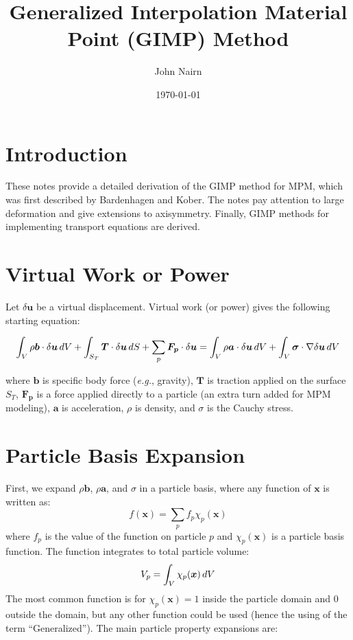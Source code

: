 \documentclass[11pt]{article}
\title{Generalized Interpolation Material Point (GIMP) Method}
\author{John Nairn}
\date{\today}
\renewcommand{\vec}[1]{\boldsymbol{#1}}
\newcommand{\tens}[1]{\boldsymbol{\mathsf{#1}}}
\begin{document}
\maketitle

\section{Introduction}

These notes provide a detailed derivation of the GIMP method for MPM, which was first described by Bardenhagen and Kober. The notes pay attention to large deformation and give extensions to axisymmetry. Finally, GIMP methods for implementing transport equations are derived.

\section{Virtual Work or Power}

Let $\delta\vec u$ be a virtual displacement. Virtual work (or power) gives the following starting equation:

\begin{equation}
\int_V \rho \vec b\cdot \delta\vec u\thinspace dV + \int_{S_T}\vec T \cdot \delta\vec u \thinspace dS + \sum_p \vec {F_p} \cdot \delta\vec u
    = \int_V \rho \vec a\cdot \delta\vec u\thinspace dV + \int_V \tens\sigma \cdot \nabla \delta\vec u\thinspace dV
\end{equation}

\noindent where $\vec b$ is specific body force ({\em e.g.}, gravity), $\vec T$ is traction applied on the surface $S_T$, $\vec {F_p}$ is a force applied directly to a particle (an extra turn added for MPM modeling), $\vec a$ is acceleration, $\rho$ is density, and $\tens\sigma$ is the Cauchy stress.

\section{Particle Basis Expansion}

First, we expand $\rho\vec b$, $\rho \vec a$, and $\tens\sigma$ in a particle basis, where any function of $\vec x$ is written as:
\begin{equation}
     f(\vec x) = \sum_p f_p \chi_p(\vec x)
\end{equation}
\noindent where $f_p$ is the value of the function on particle $p$ and $\chi_p(\vec x)$ is a particle basis function. The function integrates to
total particle volume:
\begin{equation}
   V_p =  \int_V \chi_p(\vec x)\thinspace dV
\end{equation}
\noindent The most common function is for $\chi_p(\vec x) =1$ inside the particle domain and $0$ outside the domain, but any other function could be used (hence the using of the term ``Generalized''). The main particle property expansions are:
\end{document}
